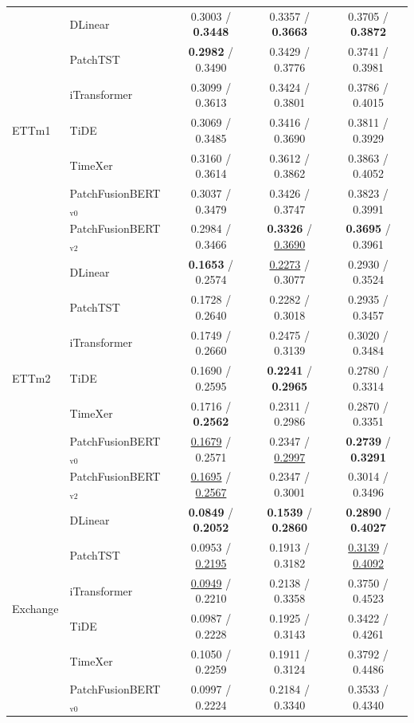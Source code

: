\documentclass{ieeeaccess}
\newcommand{\modelvzero}{PatchFusionBERT$_{\text{v0}}$\xspace}
\newcommand{\modelvtwo}{PatchFusionBERT$_{\text{v2}}$\xspace}
\newcommand{\patchtst}{PatchTST\xspace}
\newcommand{\dlinear}{DLinear\xspace}
\begin{document}
\begin{table}[!t]
{\begin{tabular}{@{}llccc@{}}
\midrule
\multirow{7}{*}{ETTm1}
& \dlinear      & 0.3003 / \textbf{0.3448} & 0.3357 / \textbf{0.3663} & 0.3705 / \textbf{0.3872} \\
& \patchtst     & \textbf{0.2982} / 0.3490 & 0.3429 / 0.3776 & 0.3741 / 0.3981 \\
& iTransformer  & 0.3099 / 0.3613 & 0.3424 / 0.3801 & 0.3786 / 0.4015 \\
& TiDE          & 0.3069 / 0.3485 & 0.3416 / 0.3690 & 0.3811 / 0.3929 \\
& TimeXer       & 0.3160 / 0.3614 & 0.3612 / 0.3862 & 0.3863 / 0.4052 \\
& \modelvzero   & 0.3037 / 0.3479 & 0.3426 / 0.3747 & 0.3823 / 0.3991 \\
& \modelvtwo    & 0.2984 / 0.3466 & \textbf{0.3326} / \underline{0.3690} & \textbf{0.3695} / 0.3961 \\
\midrule
\multirow{7}{*}{ETTm2}
& \dlinear      & \textbf{0.1653} / 0.2574 & \underline{0.2273} / 0.3077 & 0.2930 / 0.3524 \\
& \patchtst     & 0.1728 / 0.2640 & 0.2282 / 0.3018 & 0.2935 / 0.3457 \\
& iTransformer  & 0.1749 / 0.2660 & 0.2475 / 0.3139 & 0.3020 / 0.3484 \\
& TiDE          & 0.1690 / 0.2595 & \textbf{0.2241} / \textbf{0.2965} & 0.2780 / 0.3314 \\
& TimeXer       & 0.1716 / \textbf{0.2562} & 0.2311 / 0.2986 & 0.2870 / 0.3351 \\
& \modelvzero   & \underline{0.1679} / 0.2571 & 0.2347 / \underline{0.2997} & \textbf{0.2739} / \textbf{0.3291} \\
& \modelvtwo    & \underline{0.1695} / \underline{0.2567} & 0.2347 / 0.3001 & 0.3014 / 0.3496 \\
\midrule
\multirow{7}{*}{Exchange}
& \dlinear      & \textbf{0.0849} / \textbf{0.2052} & \textbf{0.1539} / \textbf{0.2860} & \textbf{0.2890} / \textbf{0.4027} \\
& \patchtst     & 0.0953 / \underline{0.2195} & 0.1913 / 0.3182 & \underline{0.3139} / \underline{0.4092} \\
& iTransformer  & \underline{0.0949} / 0.2210 & 0.2138 / 0.3358 & 0.3750 / 0.4523 \\
& TiDE          & 0.0987 / 0.2228 & 0.1925 / 0.3143 & 0.3422 / 0.4261 \\
& TimeXer       & 0.1050 / 0.2259 & 0.1911 / 0.3124 & 0.3792 / 0.4486 \\
& \modelvzero   & 0.0997 / 0.2224 & 0.2184 / 0.3340 & 0.3533 / 0.4340 \\

\end{tabular}}
\end{table}
\end{document}
